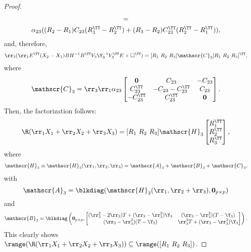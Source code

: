 \begin{proof}
\begin{multline*}
	=\\  \alpha_{23}  ((R_2-R_1)  C_{23}  (R_3^\TT - R_2^\TT)
	    + (R_3 - R_2)C_{23}^\TT(R_2^\TT-R_1^\TT) ),
\end{multline*}
and, therefore,
\begin{equation*}
	\rr_3 (\rr_1E^\TT(X_2-X_1)BH^{-1}B^\TT V_3\Y_3^{-1}V_3^\TT E+\square^\TT) =
	[R_1\ R_2\ R_3]\mathscr{C}_3 [R_1\ R_2\ R_3]^\TT,
\end{equation*}
where
\begin{equation*}
	\mathscr{C}_3 = \rr_3\rr_1 \alpha_{23}
	\begin{bmatrix}
		\textbf{0} & C_{23} & -C_{23} \\
		C_{23}^\TT  & -C_{23} - C_{23}^\TT & C_{23} \\
		-C_{23}^\TT &  C_{23}^\TT & \textbf{0}
	\end{bmatrix}.
\end{equation*}
Then, the factorization follows:
\begin{align*}%
	\R(\rr_1X_1 + \rr_2X_2 + \rr_3X_3) =
	[R_1 \ R_2 \ R_3] \mathscr{H}_3\begin{bmatrix}
		R_1^\TT \\ R_2^\TT \\ R_3^\TT
	\end{bmatrix},
\end{align*}
where
\begin{align*}
  \mathscr{H}_3 \equiv  \mathscr{H}_3(\rr_1,\rr_2,\rr_3) = \mathscr{A}_3 + \mathscr{B}_3 +
	\mathscr{C}_3,
\end{align*}
with
\begin{equation*}
	\mathscr{A}_3 = \blkdiag(\mathscr{H}_2(\rr_1,\rr_2+\rr_3), \textbf{0}_{p\times p})
\end{equation*}
and
\begin{equation*}
	\mathscr{B}_3 = \blkdiag\left(\textbf{0}_{p\times p},
	\begin{bmatrix}
		(\rr_3^2-2\rr_3)T+(\rr_3-\rr_3^2)\Y_3    &   (\rr_3-\rr_3^2)(T-\Y_3) \\
		(\rr_3-\rr_3^2)(T-\Y_3) & \rr_3^2 T +(\rr_3-\rr_3^2)\Y_3
	\end{bmatrix}\right).
\end{equation*}
This clearly shows $\range (\R(\rr_1X_1 + \rr_2X_2 + \rr_3X_3))
\subseteq \range([R_1\ R_2\ R_3])$.


\end{proof}
